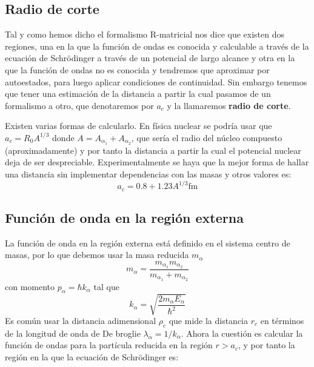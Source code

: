 \documentclass[fleqn,10pt]{SelfArx} %
\begin{document}
\subsection{Radio de corte}

Tal y como hemos dicho el formalismo R-matricial nos dice que existen dos regiones, una en la que la función de ondas es conocida y calculable a través de la ecuación de Schrödinger a través de un potencial de largo alcance y otra en la que la función de ondas no es conocida y tendremos que aproximar por autoestados, para luego aplicar condiciones de continuidad. Sin embargo tenemos que tener una estimación de la distancia a partir la cual pasamos de un formalismo a otro, que denotaremos por $a_c$ y la llamaremos \textbf{radio de corte}. 

Existen varias formas de calcularlo. En física nuclear se podría usar que $a_c=R_0 A^{1/3}$ donde $A=A_{\alpha_1}+A_{\alpha_2}$, que sería el radio del núcleo compuesto (aproximadamente) y por tanto la distancia a partir la cual el potencial nuclear deja de ser despreciable. Experimentalmente se haya que la mejor forma de hallar una distancia sin implementar dependencias con las masas y otros valores es:
\begin{equation}
	a_c = 0.8 + 1.23 A^{1/3} \text{fm}
\end{equation} 

\subsection{Función de onda en la región externa}

La función de onda en la región externa está definido en el sistema centro de masas, por lo que debemos usar la masa reducida $m_\alpha$ 
\begin{equation}
	m_\alpha = \frac{m_{\alpha_1}m_{\alpha_2}}{m_{\alpha_1}+m_{\alpha_2}}
\end{equation}
con momento $p_{\alpha}=\hbar k_\alpha$ tal que 
\begin{equation}
	k_\alpha =\sqrt{\frac{2m_{\alpha} E_\alpha}{\hbar^2}}
\end{equation}
Es común usar la distancia adimensional $\rho_c$ que mide la distancia $r_c$ en términos de la longitud de onda de De broglie $\lambda_\alpha=1/k_\alpha$. Ahora la cuestión es calcular la función de ondas para la partícula reducida en la región $r>a_c$, y por tanto la región en la que la ecuación de Schrödinger es:
\end{document}
